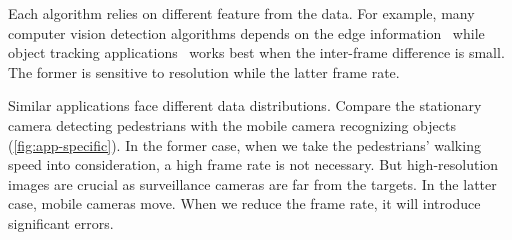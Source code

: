 Each algorithm relies on different feature from the data. For example, many
computer vision detection algorithms depends on the edge
information~\cite{canny1986computational, lowe2004distinctive, viola2001rapid}
while object tracking applications~\cite{allen2004object} works best when the
inter-frame difference is small. The former is sensitive to resolution while the
latter frame rate.

Similar applications face different data distributions. Compare the stationary
camera detecting pedestrians with the mobile camera recognizing objects
(\autoref{fig:app-specific}). In the former case, when we take the pedestrians'
walking speed into consideration, a high frame rate is not necessary. But
high-resolution images are crucial as surveillance cameras are far from the
targets. In the latter case, mobile cameras move. When we reduce the frame rate,
it will introduce significant errors.

